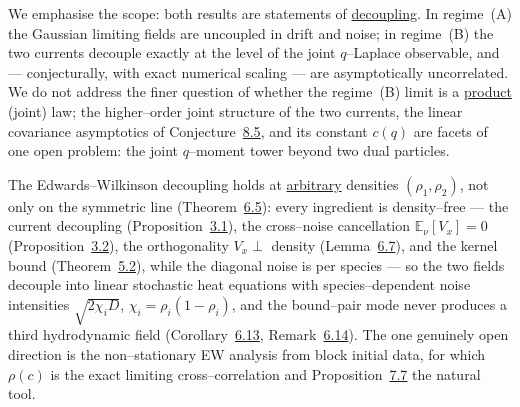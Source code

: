 \documentclass[11pt]{article}
\theoremstyle{plain}
\theoremstyle{definition}
\theoremstyle{remark}
\newcommand{\E}{\mathbb{E}}\newcommand{\PP}{\mathbb{P}}\newcommand{\dd}{\,\mathrm{d}}
\begin{document}
We emphasise the scope: both results are statements of \underline{decoupling}. In regime~(A)
the Gaussian limiting fields are uncoupled in drift and noise; in regime~(B) the two
currents decouple exactly at the level of the joint $q$--Laplace observable, and ---
conjecturally, with exact numerical scaling --- are asymptotically uncorrelated. We
do not address the finer question of whether the regime~(B) limit is a \underline{product}
(joint) law; the higher--order joint structure of the two currents, the linear
covariance asymptotics of Conjecture~\hyperref[conj_cov]{8.5}, and its constant $c(q)$ are
facets of one open problem: the joint $q$--moment tower beyond two dual particles.

The Edwards--Wilkinson decoupling holds at \underline{arbitrary} densities $(\rho_1,\rho_2)$,
not only on the symmetric line (Theorem~\hyperref[thm_ewmain]{6.5}): every ingredient is
density--free --- the current decoupling (Proposition~\hyperref[prop_decouple]{3.1}), the
cross--noise cancellation $\E_\nu[V_x]=0$ (Proposition~\hyperref[prop_cross]{3.2}), the
orthogonality $V_x\perp$ density (Lemma~\hyperref[lem_orth]{6.7}), and the kernel bound
(Theorem~\hyperref[thm_kernel]{5.2}), while the diagonal noise is per species --- so the two
fields decouple into linear stochastic heat equations with species--dependent noise
intensities $\sqrt{2\chi_iD}$, $\chi_i=\rho_i(1-\rho_i)$, and the bound--pair mode never
produces a third hydrodynamic field (Corollary~\hyperref[prop_sym]{6.13}, Remark~\hyperref[rem_offline]{6.14}).
The one genuinely open direction is the non--stationary EW analysis from block initial
data, for which $\rho(c)$ is the exact limiting cross--correlation and
Proposition~\hyperref[prop_twophase]{7.7} the natural tool.
\end{document}

